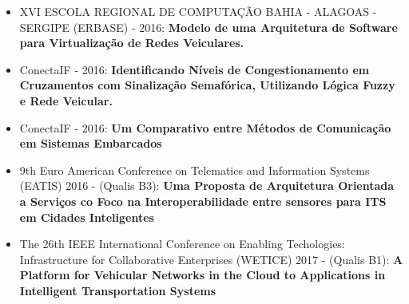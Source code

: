 \documentclass[
	12pt,				%
	oneside,			%
	a4paper,			%
	english,			%
	brazil				%
	]{abntex2ppgsi}
\begin{document}
\begin{itemize}

	\item {XVI ESCOLA REGIONAL DE COMPUTAÇÃO BAHIA - ALAGOAS - SERGIPE  (ERBASE) - 2016: \textbf{Modelo de uma Arquitetura de Software para Virtualização de Redes Veiculares.}}
	
	\item {ConectaIF - 2016: \textbf{Identificando Níveis de Congestionamento em Cruzamentos com Sinalização Semafórica, Utilizando Lógica Fuzzy e Rede Veicular.}}
	
	\item {ConectaIF - 2016: \textbf{Um Comparativo entre Métodos de Comunicação em Sistemas Embarcados}}
	
	\item{9th Euro American Conference on Telematics and Information Systems (EATIS) 2016 - (Qualis B3): \textbf{Uma Proposta de Arquitetura Orientada a Serviços co Foco na Interoperabilidade entre sensores para ITS em Cidades Inteligentes} }
	
	\item{The 26th IEEE International Conference on Enabling Techologies: Infrastructure for Collaborative Enterprises (WETICE) 2017 - (Qualis B1): \textbf{A Platform for Vehicular Networks in the Cloud to Applications in Intelligent Transportation Systems} }

\end{itemize}
\postextual



%
%






\end{document}
